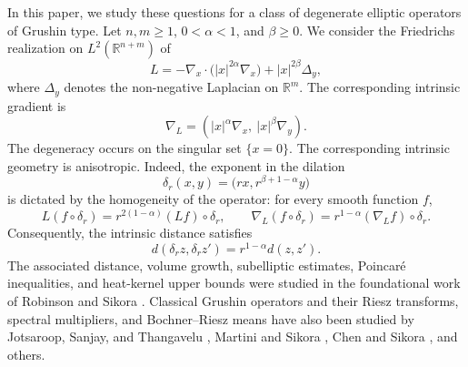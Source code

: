 \documentclass[12pt]{amsart}
\begin{document}
In this paper, we study these questions for a class of degenerate elliptic operators of Grushin type. Let $n,m\geq1$, $0<\alpha<1$, and $\beta\geq0$. We consider the Friedrichs realization on $L^2(\mathbb R^{n+m})$ of
\begin{equation}\label{Grushin}
   L=-\nabla_x\cdot\bigl(|x|^{2\alpha}\nabla_x\bigr)
     +|x|^{2\beta}\Delta_y,
\end{equation}
where $\Delta_y$ denotes the non-negative Laplacian on $\mathbb R^m$. The corresponding intrinsic gradient is
\begin{equation}\label{Grushin2}
    \nabla_L
    =
    \left(|x|^\alpha\nabla_x,\ |x|^\beta\nabla_y\right).
\end{equation}
The degeneracy occurs on the singular set $\{x=0\}$. The corresponding
intrinsic geometry is anisotropic. Indeed, the exponent in the dilation
\begin{equation*}
    \delta_r(x,y)
    =
    \bigl(rx,r^{\beta+1-\alpha}y\bigr)
\end{equation*}
is dictated by the homogeneity of the operator: for every smooth function
$f$,
\begin{equation*}
    L(f\circ\delta_r)
    =
    r^{2(1-\alpha)}(Lf)\circ\delta_r,
    \qquad
    \nabla_L(f\circ\delta_r)
    =
    r^{1-\alpha}(\nabla_Lf)\circ\delta_r.
\end{equation*}
Consequently, the intrinsic distance satisfies
\begin{equation*}
    d(\delta_r z,\delta_r z')
    =
    r^{1-\alpha}d(z,z').
\end{equation*}
The associated distance, volume growth, subelliptic estimates, Poincar\'e inequalities, and heat-kernel upper bounds were studied in the foundational work of Robinson and Sikora \cite{RS,RS2,RS_1D}. Classical Grushin operators and their Riesz transforms, spectral multipliers, and Bochner--Riesz means have also been studied by Jotsaroop, Sanjay, and Thangavelu \cite{JST}, Martini and Sikora \cite{MS}, Chen and Sikora \cite{ChenSikora}, and others.
\end{document}

